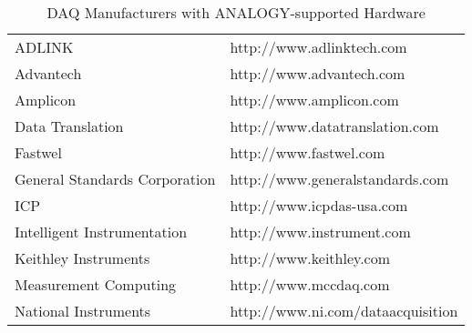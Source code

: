 \vspace{1cm}
\begin{table}[htdp]
\caption{DAQ Manufacturers with ANALOGY-supported Hardware}
\label{DAQs}
\begin{center}
\vspace{.5cm}
\begin{tabular}{ll}
ADLINK & http://www.adlinktech.com\\
Advantech & http://www.advantech.com\\
Amplicon & http://www.amplicon.com\\
Data Translation & http://www.datatranslation.com\\
Fastwel & http://www.fastwel.com\\
General Standards Corporation & http://www.generalstandards.com\\
ICP & http://www.icpdas-usa.com\\
Intelligent Instrumentation & http://www.instrument.com\\
Keithley Instruments & http://www.keithley.com\\
Measurement Computing & http://www.mccdaq.com\\
National Instruments & http://www.ni.com/dataacquisition\\
\end{tabular}
\end{center}
\end{table}
\vspace{1cm}

